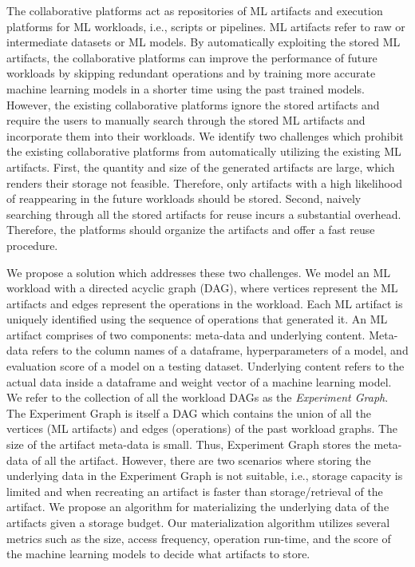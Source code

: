 The collaborative platforms act as repositories of ML artifacts and execution platforms for ML workloads, i.e., scripts or pipelines.
ML artifacts refer to raw or intermediate datasets or ML models.
By automatically exploiting the stored ML artifacts, the collaborative platforms can improve the performance of future workloads by skipping redundant operations and by training more accurate machine learning models in a shorter time using the past trained models.
However, the existing collaborative platforms ignore the stored artifacts and require the users to manually search through the stored ML artifacts and incorporate them into their workloads.
We identify two challenges which prohibit the existing collaborative platforms from automatically utilizing the existing ML artifacts.
First, the quantity and size of the generated artifacts are large, which renders their storage not feasible.
Therefore, only artifacts with a high likelihood of reappearing in the future workloads should be stored.
Second, naively searching through all the stored artifacts for reuse incurs a substantial overhead.
Therefore, the platforms should organize the artifacts and offer a fast reuse procedure.

We propose a solution which addresses these two challenges.
We model an ML workload with a directed acyclic graph (DAG), where vertices represent the ML artifacts and edges represent the operations in the workload.
Each ML artifact is uniquely identified using the sequence of operations that generated it.
An ML artifact comprises of two components: meta-data and underlying content.
Meta-data refers to the column names of a dataframe, hyperparameters of a model, and evaluation score of a model on a testing dataset.
Underlying content refers to the actual data inside a dataframe and weight vector of a machine learning model.
We refer to the collection of all the workload DAGs as the \textit{Experiment Graph}.
The Experiment Graph is itself a DAG which contains the union of all the vertices (ML artifacts) and edges (operations) of the past workload graphs.
The size of the artifact meta-data is small.
Thus, Experiment Graph stores the meta-data of all the artifact.
However, there are two scenarios where storing the underlying data in the Experiment Graph is not suitable, i.e., storage capacity is limited and when recreating an artifact is faster than storage/retrieval of the artifact.
We propose an algorithm for materializing the underlying data of the artifacts given a storage budget.
Our materialization algorithm utilizes several metrics such as the size, access frequency, operation run-time, and the score of the machine learning models to decide what artifacts to store.

